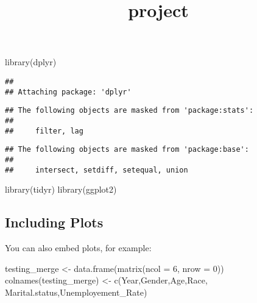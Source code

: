 \documentclass[
]{article}
\title{project}
\author{}
\date{\vspace{-2.5em}}
\newenvironment{Shaded}{\begin{snugshade}}{\end{snugshade}}
\newcommand{\AttributeTok}[1]{\textcolor[rgb]{0.77,0.63,0.00}{#1}}
\newcommand{\DecValTok}[1]{\textcolor[rgb]{0.00,0.00,0.81}{#1}}
\newcommand{\FunctionTok}[1]{\textcolor[rgb]{0.00,0.00,0.00}{#1}}
\newcommand{\NormalTok}[1]{#1}
\newcommand{\OtherTok}[1]{\textcolor[rgb]{0.56,0.35,0.01}{#1}}
\newcommand{\StringTok}[1]{\textcolor[rgb]{0.31,0.60,0.02}{#1}}
\begin{document}
\maketitle

\begin{Shaded}
\begin{Highlighting}[]
\FunctionTok{library}\NormalTok{(dplyr)}
\end{Highlighting}
\end{Shaded}

\begin{verbatim}
## 
## Attaching package: 'dplyr'
\end{verbatim}

\begin{verbatim}
## The following objects are masked from 'package:stats':
## 
##     filter, lag
\end{verbatim}

\begin{verbatim}
## The following objects are masked from 'package:base':
## 
##     intersect, setdiff, setequal, union
\end{verbatim}

\begin{Shaded}
\begin{Highlighting}[]
\FunctionTok{library}\NormalTok{(tidyr)}
\FunctionTok{library}\NormalTok{(ggplot2)}
\end{Highlighting}
\end{Shaded}

\hypertarget{including-plots}{%
\subsection{Including Plots}\label{including-plots}}

You can also embed plots, for example:

\begin{Shaded}
\begin{Highlighting}[]
\NormalTok{testing\_merge }\OtherTok{\textless{}{-}} \FunctionTok{data.frame}\NormalTok{(}\FunctionTok{matrix}\NormalTok{(}\AttributeTok{ncol =} \DecValTok{6}\NormalTok{, }\AttributeTok{nrow =} \DecValTok{0}\NormalTok{))}
\FunctionTok{colnames}\NormalTok{(testing\_merge) }\OtherTok{\textless{}{-}} \FunctionTok{c}\NormalTok{(}\StringTok{\textquotesingle{}Year\textquotesingle{}}\NormalTok{,}\StringTok{\textquotesingle{}Gender\textquotesingle{}}\NormalTok{,}\StringTok{\textquotesingle{}Age\textquotesingle{}}\NormalTok{,}\StringTok{\textquotesingle{}Race\textquotesingle{}}\NormalTok{, }\StringTok{\textquotesingle{}Marital.status\textquotesingle{}}\NormalTok{,}\StringTok{\textquotesingle{}Unemployement\_Rate\textquotesingle{}}\NormalTok{)}
\end{Highlighting}
\end{Shaded}
\end{document}
